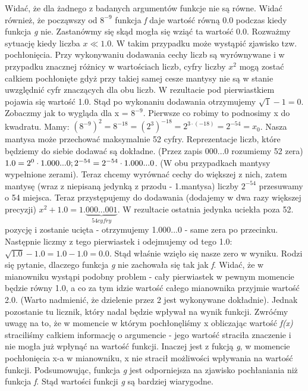 \documentclass[]{article}
\begin{document}
	\clearpage
	Widać, że dla żadnego z badanych argumentów funkcje nie są równe. Widać również, że począwszy od \(8^{-9}\) funkcja \textit{f} daje wartość równą 0.0 podczas kiedy funkcja \textit{g} nie. Zastanówmy się skąd mogła się wziąć ta wartość 0.0. Rozważmy sytuację kiedy liczba $x \ll 1.0$. W takim przypadku może wystąpić zjawisko tzw. pochłonięcia. Przy wykonywaniu dodawania cechy liczb są wyrównywane i w przypadku znacznej różnicy w wartościach liczb, cyfry liczby $x^2$ mogą zostać całkiem pochłonięte gdyż przy takiej samej cesze mantysy nie są w stanie uwzględnić cyfr znaczących dla obu liczb. W rezultacie pod pierwiastkiem pojawia się wartość 1.0. Stąd po wykonaniu dodawania otrzymujemy \(\sqrt{1} - 1 = 0\).\newline
	Zobaczmy jak to wygląda dla x = \(8^{-9}\). Pierwsze co robimy to podnosimy x do kwadratu. Mamy:
	 \(({8^{-9}})^2 = 8^{-18} = ({2^3})^{-18} = 2^{3 \cdot (-18)} = 2^{-54} = x_0\). Nasza mantysa może przechować maksymalnie 52 cyfry. Reprezentacje liczb, które będziemy do siebie dodawać są dokładne. (Przez zapis 000...0 rozumiemy 52 zera)
	 \(1.0 = 2^0 \cdot 1.000...0;\space\space2^{-54} = 2^{-54} \cdot 1.000...0\). (W obu przypadkach mantysy wypełnione zerami). Teraz chcemy wyrównać cechy do większej z nich, zatem mantysę (wraz z niepisaną jedynką z przodu - 1.mantysa) liczby $2^{-54}$ przesuwamy o 54 miejsca. Teraz przystępujemy do dodawania (dodajemy w dwa razy większej precyzji) $x^2 + 1.0 = 1.\underbrace{000...001}_{54 cyfry}$.
	 W rezultacie ostatnia jedynka uciekła poza 52. pozycję i zostanie ucięta - otrzymujemy 1.000...0 - same zera po przecinku. Następnie liczmy z tego pierwiastek i odejmujemy od tego 1.0: \(\sqrt{1.0} - 1.0 = 1.0 - 1.0 = 0.0\). Stąd właśnie wzięło się nasze zero w wyniku.\newline
	 Rodzi się pytanie, dlaczego funkcja \textit{g} nie zachowała się tak jak \textit{f}. Widać, że w mianowniku wystąpi podobny problem - cały pierwiastek w pewnym momencie będzie równy 1.0, a co za tym idzie wartość całego mianownika przyjmie wartość 2.0. (Warto nadmienić, że dzielenie przez 2 jest wykonywane dokładnie). Jednak pozostanie tu licznik, który nadal będzie wpływał na wynik funkcji. Zwróćmy uwagę na to, że w momencie w którym pochłonęliśmy x obliczając wartość \textit{f(x)} straciliśmy całkiem informację o argumencie - jego wartość straciła znaczenie i nie mogła już wpłynąć na wartość funkcji. Inaczej jest z fukcją \textit{g}, w momencie pochłonięcia x-a w mianowniku, x nie stracił możliwości wpływania na wartość funkcji. Podsumowując, funkcja \textit{g} jest odporniejsza na zjawisko pochłaniania niż funkcja \textit{f}. Stąd wartości funkcji \textit{g} są bardziej wiarygodne.
	\clearpage
\end{document}
